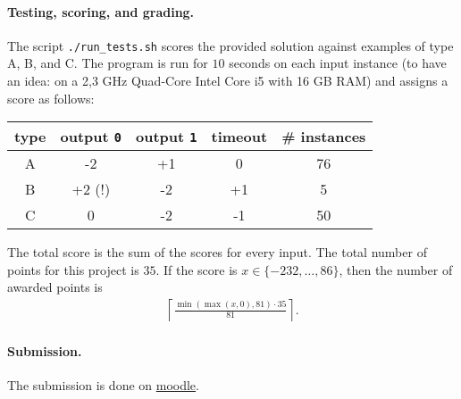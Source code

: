\documentclass[zad,zawodnik,en]{sinol}
\begin{document}
    \paragraph{Testing, scoring, and grading.}
    The script \texttt{./run\_tests.sh} scores the provided solution
    against examples of type A, B, and C.
    The program is run for $10$ seconds on each input instance
    (to have an idea: on a 2,3 GHz Quad-Core Intel Core i5 with 16 GB RAM)
    and assigns a score as follows:
    \begin{center}
      \begin{tabular}{c|c|c|c|c}
        type  & output \texttt{0}  & output \texttt{1}  & timeout & \# instances \\ \hline \hline
        A     & -2          & +1          & 0       & 76\\ \hline
        B     & +2 (!)      & -2          & +1      & 5 \\ \hline
        C     & 0           & -2          & -1      & 50
      \end{tabular}
    \end{center}
    The total score is the sum of the scores for every input.
    The total number of points for this project is $35$.
    If the score is $x \in \{-232, \dots, 86\}$,
    then the number of awarded points is
    \begin{align*}
      \left\lceil\frac {\min (\max (x, 0), 81) \cdot 35}{81}\right\rceil.
    \end{align*}

    \paragraph{Submission.}
    The submission is done on \href{}{moodle}.
\end{document}
